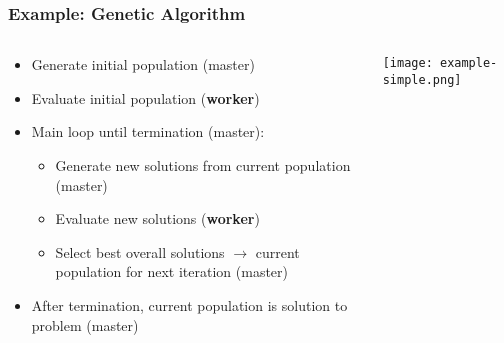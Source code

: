 \begin{frame}
  \frametitle{Example: Genetic Algorithm}
  \begin{columns}
    \begin{column}{.7\textwidth}
      \begin{itemize}
	\item Generate initial population (master)
	\item Evaluate initial population (\textbf{worker})
	\item Main loop until termination (master):
	\begin{itemize}
	  \item Generate new solutions from current population (master)
	  \item Evaluate new solutions (\textbf{worker})
	  \item Select best overall solutions $\rightarrow$ current population for next iteration (master)
	\end{itemize}
	\item After termination, current population is solution to problem (master)
      \end{itemize}
    \end{column}
    \begin{column}{.3\textwidth}
      \begin{center}
	\texttt{[image: example-simple.png]}
      \end{center}
    \end{column}
  \end{columns}
\end{frame}